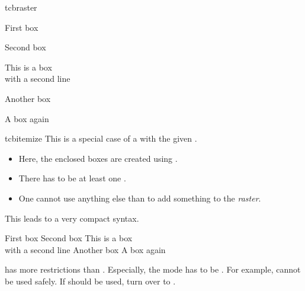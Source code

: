 \begin{docEnvironment}[doc new and updated={2014-11-10}{2017-02-01}]{tcbraster}{}
\begin{dispExample}
\begin{tcbraster}[raster columns=2, raster equal height=rows,
  size=small,colframe=red!50!black,colback=red!10!white,colbacktitle=red!50!white,
  title={Box \# \thetcbrasternum}]
  \begin{tcolorbox}First box\end{tcolorbox}
  \begin{tcolorbox}Second box\end{tcolorbox}
  \begin{tcolorbox}This is a box\\with a second line\end{tcolorbox}
  \begin{tcolorbox}Another box\end{tcolorbox}
  \begin{tcolorbox}A box again\end{tcolorbox}
\end{tcbraster}
\end{dispExample}
\end{docEnvironment}


\clearpage

\begin{docEnvironment}[doc new=2014-11-10]{tcbitemize}{}
This is a special case of a  with the given .
\begin{itemize}
\item Here, the enclosed boxes are created using .
\item There has to be at least one .
\item One cannot use anything else than  to add something
  to the \emph{raster}.
\end{itemize}
This leads to a very compact syntax.

\begin{dispExample}
\begin{tcbitemize}[raster columns=2, raster equal height=rows,
  size=small,colframe=red!50!black,colback=red!10!white,colbacktitle=red!50!white,
  title={Box \# \thetcbrasternum}]
  \tcbitem First box
  \tcbitem Second box
  \tcbitem This is a box\\with a second line
  \tcbitem[colback=yellow,colbacktitle=yellow!50!black] Another box
  \tcbitem A box again
\end{tcbitemize}
\end{dispExample}

\begin{marker}
 has more restrictions than .
Especially, the  mode has to be .
For example,  cannot be used safely.
If  should be used, turn over to .
\end{marker}
\end{docEnvironment}


